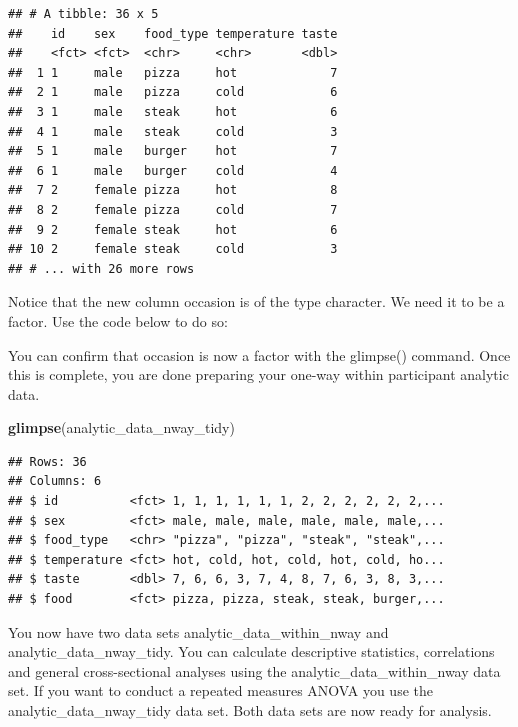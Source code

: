 \documentclass[
]{krantz}
\makeatletter
\newenvironment{Shaded}{\begin{snugshade}}{\end{snugshade}}
\newcommand{\DataTypeTok}[1]{\textcolor[rgb]{0.27,0.27,0.27}{#1}}
\newcommand{\KeywordTok}[1]{\textcolor[rgb]{0.27,0.27,0.27}{\textbf{#1}}}
\newcommand{\NormalTok}[1]{#1}
\newcommand{\OperatorTok}[1]{\textcolor[rgb]{0.43,0.43,0.43}{\textbf{#1}}}
\newcommand{\StringTok}[1]{\textcolor[rgb]{0.5,0.5,0.5}{#1}}
\newenvironment{kframe}{%
\medskip{}
\setlength{\fboxsep}{.8em}
 \def\at@end@of@kframe{}%
 \ifinner\ifhmode%
  \def\at@end@of@kframe{\end{minipage}}%
  \begin{minipage}{\columnwidth}%
 \fi\fi%
 \def\FrameCommand##1{\hskip\@totalleftmargin \hskip-\fboxsep
 \colorbox{shadecolor}{##1}\hskip-\fboxsep
     \hskip-\linewidth \hskip-\@totalleftmargin \hskip\columnwidth}%
 \MakeFramed {\advance\hsize-\width
   \@totalleftmargin\z@ \linewidth\hsize
   \@setminipage}}%
 {\par\unskip\endMakeFramed%
 \at@end@of@kframe}
\renewenvironment{Shaded}{\begin{kframe}}{\end{kframe}}
\makeatother
\begin{document}
\begin{verbatim}
## # A tibble: 36 x 5
##    id    sex    food_type temperature taste
##    <fct> <fct>  <chr>     <chr>       <dbl>
##  1 1     male   pizza     hot             7
##  2 1     male   pizza     cold            6
##  3 1     male   steak     hot             6
##  4 1     male   steak     cold            3
##  5 1     male   burger    hot             7
##  6 1     male   burger    cold            4
##  7 2     female pizza     hot             8
##  8 2     female pizza     cold            7
##  9 2     female steak     hot             6
## 10 2     female steak     cold            3
## # ... with 26 more rows
\end{verbatim}

Notice that the new column occasion is of the type character. We need it to be a factor. Use the code below to do so:

\begin{Shaded}
\end{Shaded}

You can confirm that occasion is now a factor with the glimpse() command. Once this is complete, you are done preparing your one-way within participant analytic data.

\begin{Shaded}
\begin{Highlighting}[]
\KeywordTok{glimpse}\NormalTok{(analytic_data_nway_tidy)}
\end{Highlighting}
\end{Shaded}

\begin{verbatim}
## Rows: 36
## Columns: 6
## $ id          <fct> 1, 1, 1, 1, 1, 1, 2, 2, 2, 2, 2, 2,...
## $ sex         <fct> male, male, male, male, male, male,...
## $ food_type   <chr> "pizza", "pizza", "steak", "steak",...
## $ temperature <fct> hot, cold, hot, cold, hot, cold, ho...
## $ taste       <dbl> 7, 6, 6, 3, 7, 4, 8, 7, 6, 3, 8, 3,...
## $ food        <fct> pizza, pizza, steak, steak, burger,...
\end{verbatim}

You now have two data sets analytic\_data\_within\_nway and analytic\_data\_nway\_tidy. You can calculate descriptive statistics, correlations and general cross-sectional analyses using the analytic\_data\_within\_nway data set. If you want to conduct a repeated measures ANOVA you use the analytic\_data\_nway\_tidy data set. Both data sets are now ready for analysis.
\end{document}
